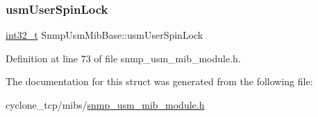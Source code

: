 \subsubsection{\texorpdfstring{usm\+User\+Spin\+Lock}{usmUserSpinLock}}
{\footnotesize\ttfamily \hyperlink{stdint_8h_ab1967d8591af1a4e48c37fd2b0f184d0}{int32\+\_\+t} Snmp\+Usm\+Mib\+Base\+::usm\+User\+Spin\+Lock}



Definition at line 73 of file snmp\+\_\+usm\+\_\+mib\+\_\+module.\+h.



The documentation for this struct was generated from the following file\+:\begin{DoxyCompactItemize}
\item 
cyclone\+\_\+tcp/mibs/\hyperlink{snmp__usm__mib__module_8h}{snmp\+\_\+usm\+\_\+mib\+\_\+module.\+h}\end{DoxyCompactItemize}
